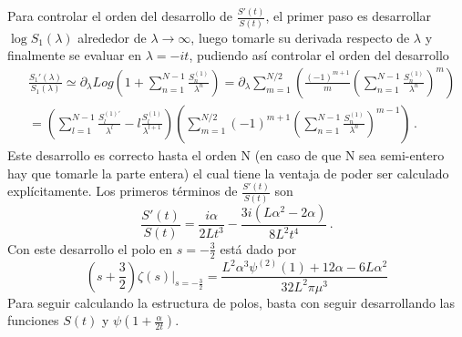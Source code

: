 Para controlar el orden del desarrollo de $ \frac{S' ( t)}{ S ( t)} $, el primer paso es desarrollar $\log S _1 (\lambda)$ alrededor de $\lambda \rightarrow \infty$, luego tomarle su derivada respecto de $\lambda$ y finalmente se evaluar en $\lambda = -i t$, pudiendo así controlar el orden del desarrollo
\begin{align}
&
\nonumber
	\frac{S _1 '( \lambda)}{S _1 ( \lambda )} 
	\simeq 
	\partial _{\lambda} Log \left(
						1 + \sum _{n=1} ^{N-1}  \frac{S ^{(1)} _n}{\lambda ^n}
						\right) =
\partial _{\lambda} 
\sum _{m = 1} ^{N/2} 
	\left(
	\frac{(-1) ^{m+1} }{m}
	\left(
		\sum _{n=1} ^{N-1} \frac{S ^{(1)} _n}{\lambda ^n}
		\right) ^m 
	\right)  \\[10pt]
	&=
\left(								
	\sum _{l = 1} ^{N-1} 
	\frac{S  ^{(1) '} _l}{\lambda ^l} - l \frac{S ^{(1)}  _l}{\lambda ^{l+1}}
	\right)							
\left(
	\sum _{m = 1} ^{N/2} (-1) ^{m+1} 
	\left(
			\sum _{n=1} ^{N-1} \frac{S ^{(1)} _n}{\lambda ^n}
			\right) ^{m-1}		
	\right)
\, .
\end{align}	
Este desarrollo  es correcto hasta el orden N (en caso de que N sea semi-entero hay que tomarle la parte entera) el cual tiene la ventaja de poder ser calculado explícitamente. Los primeros términos de $\frac{S'(t)}{S(t)}$ son
\begin{equation}
\frac{S'(t)}{S(t)} = 
\frac{i \alpha}{2 L t^3} -
\frac{3 i (L \alpha ^2 - 2 \alpha)}{8 L^2 t ^4}
\, .
\end{equation}
Con este desarrollo el polo en $s=-\frac{3}{2}$ está dado por 
\begin{equation}
\left( s+ \frac{3}{2} \right)
\zeta  (s) \Big| _{s = - \frac{3}{2}}= 
\frac{L ^2 \alpha  ^3 \psi ^{(2)} (1) + 12   \alpha  - 6 L \alpha ^2}{32 L^2 \pi \mu ^3}
\end{equation}
Para seguir calculando la estructura de polos, basta con seguir desarrollando las funciones $S(t)$ y $\psi (1 + \frac{\alpha}{2 t})$.


